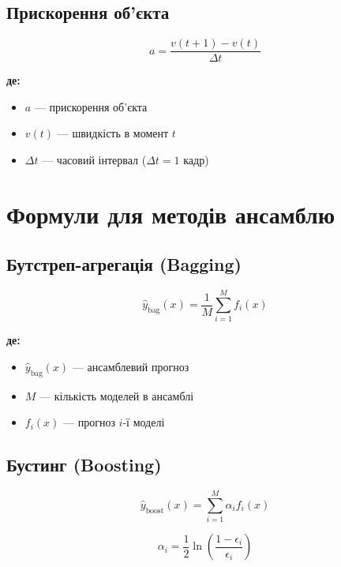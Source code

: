 \documentclass[14pt, a4paper]{extarticle}
\numberwithin{equation}{section}
\begin{document}
\subsection{Прискорення об'єкта}

\begin{equation}
\boxed{a = \frac{v(t+1) - v(t)}{\Delta t}} \tag{52}
\end{equation}

\textbf{де:}
\begin{itemize}
\item $a$ — прискорення об'єкта
\item $v(t)$ — швидкість в момент $t$
\item $\Delta t$ — часовий інтервал ($\Delta t = 1$ кадр)
\end{itemize}

\newpage

\section{Формули для методів ансамблю}

\subsection{Бутстреп-агрегація (Bagging)}

\begin{equation}
\boxed{\hat{y}_{\text{bag}}(x) = \frac{1}{M} \sum_{i=1}^{M} f_i(x)} \tag{53}
\end{equation}

\textbf{де:}
\begin{itemize}
\item $\hat{y}_{\text{bag}}(x)$ — ансамблевий прогноз
\item $M$ — кількість моделей в ансамблі
\item $f_i(x)$ — прогноз $i$-ї моделі
\end{itemize}

\subsection{Бустинг (Boosting)}

\begin{equation}
\boxed{\hat{y}_{\text{boost}}(x) = \sum_{i=1}^{M} \alpha_i f_i(x)} \tag{54}
\end{equation}

\begin{equation}
\boxed{\alpha_i = \frac{1}{2} \ln\left( \frac{1 - \epsilon_i}{\epsilon_i} \right)} \tag{55}
\end{equation}
\end{document}
